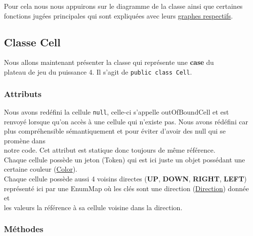 \documentclass[11pt]{article}
\begin{document}
Pour cela nous nous appuirons sur le diagramme de la classe ainsi que certaines\\
fonctions jugées principales qui sont expliquées avec leurs \hyperref[org4590a0e]{graphes respectifs}.\\

\subsection{Classe Cell\label{org4b22c5b}}
\label{sec:org209944a}

Nous allons maintenant présenter la classe qui représente une \textbf{case} du\\
plateau de jeu du puissance 4. Il s'agit de \texttt{public class Cell}.\\

\subsubsection{Attributs}
\label{sec:orgeb77d80}

Nous avons redéfini la cellule \texttt{null}, celle-ci s'appelle outOfBoundCell et est\\
renvoyé lorsque qu'on accès à une cellule qui n'existe pas. Nous avons rédéfini car\\
plus compréhensible sémantiquement et pour éviter d'avoir des null qui se promène dans\\
notre code. Cet attribut est statique donc toujours de même référence.\\

Chaque cellule possède un jeton (Token) qui est ici juste un objet possédant une\\
certaine couleur (\hyperref[orgcc866a3]{Color}).\\

Chaque cellule possède aussi 4 voisins directes (\textbf{UP}, \textbf{DOWN}, \textbf{RIGHT}, \textbf{LEFT})\\
représenté ici par une EnumMap où les clés sont une direction (\hyperref[orged4a61f]{Direction}) donnée et\\
les valeurs la référence à sa cellule voisine dans la direction.\\

\subsubsection{Méthodes}
\label{sec:org7131036}
\end{document}
